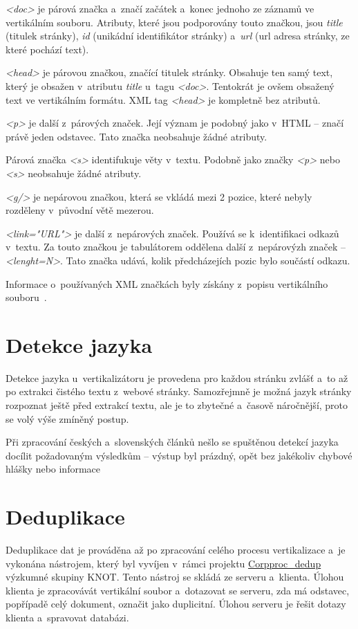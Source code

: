 \textit{<doc>} je párová značka a~značí začátek a~konec jednoho ze záznamů ve vertikálním souboru.
Atributy, které jsou podporovány touto značkou, jsou \textit{title} (titulek stránky),
\textit{id} (unikádní identifikátor stránky) a~\textit{url} (url adresa stránky, ze které pochází text).

\textit{<head>} je párovou značkou, značící titulek stránky. Obsahuje ten samý text, který je obsažen v~atributu
\textit{title} u~tagu \textit{<doc>}. Tentokrát je ovšem obsažený text ve vertikálním formátu. XML tag
\textit{<head>} je kompletně bez atributů.

\textit{<p>} je další z~párových značek. Její význam je podobný jako v~HTML -- značí právě jeden odstavec.
Tato značka neobsahuje žádné atributy.

Párová značka \textit{<s>} identifukuje věty v~textu. Podobně jako značky \textit{<p>} nebo \textit{<s>}
neobsahuje žádné atributy.

\textit{<g/>} je nepárovou značkou, která se vkládá mezi 2 pozice, které nebyly rozděleny v~původní větě
mezerou.

\textit{<link="URL"\textgreater} je další z~nepárových značek. Používá se k~identifikaci odkazů v~textu. Za touto
značkou je tabulátorem oddělena další z~nepárovýzh značek -- \textit{<lenght=N>}. Tato značka
udává, kolik předcházejích pozic bylo součástí odkazu.

Informace o~používaných XML značkách byly získány z~popisu vertikálního souboru~\cite{VERTIKAL}.

\section{Detekce jazyka}
Detekce jazyka u~vertikalizátoru je provedena pro každou stránku zvlášť a~to až po extrakci čistého textu z~webové stránky.
Samozřejmně je možná jazyk stránky rozpoznat ještě před extrakcí textu, ale je to zbytečné a~časově náročnější,
proto se volý výše zmíněný postup.

Při zpracování českých a~slovenských článků nešlo se spuštěnou detekcí jazyka docílit požadovaným výsledkům -- výstup
byl prázdný, opět bez jakékoliv chybové hlášky nebo informace

\section{Deduplikace}
Deduplikace dat je prováděna až po zpracování celého procesu vertikalizace a~je vykonána nástrojem,
který byl vyvíjen v~rámci projektu \href{https://knot.fit.vutbr.cz/wiki/index.php/Corpproc_dedup}{Corpproc\_dedup}
výzkumné skupiny KNOT.
Tento nástroj se skládá ze serveru a~klienta. Úlohou klienta je zpracovávát vertikální soubor a~dotazovat
se serveru, zda má odstavec, popřípadě celý dokument, označit jako duplicitní. Úlohou serveru je
řešit dotazy klienta a~spravovat databázi.

